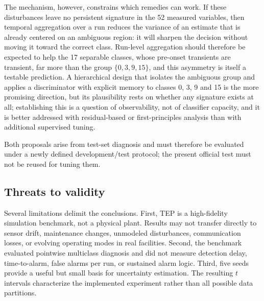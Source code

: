 \documentclass[12pt,a4paper]{article}
\begin{document}
The mechanism, however, constrains which remedies can work. If these
disturbances leave no persistent signature in the 52 measured variables, then
temporal aggregation over a run reduces the variance of an estimate that is
already centered on an ambiguous region: it will sharpen the decision without
moving it toward the correct class. Run-level aggregation should therefore be
expected to help the 17 separable classes, whose pre-onset transients are
transient, far more than the group $\{0,3,9,15\}$, and this asymmetry is itself
a testable prediction. A hierarchical design that isolates the ambiguous group
and applies a discriminator with explicit memory to classes 0, 3, 9 and 15 is
the more promising direction, but its plausibility rests on whether any
signature exists at all; establishing this is a question of observability, not
of classifier capacity, and it is better addressed with residual-based or
first-principles analysis than with additional supervised tuning.

Both proposals arise from test-set diagnosis and must therefore be evaluated
under a newly defined development/test protocol; the present official test must
not be reused for tuning them.

\subsection{Threats to validity}

Several limitations delimit the conclusions. First, TEP is a high-fidelity
simulation benchmark, not a physical plant. Results may not transfer directly
to sensor drift, maintenance changes, unmodeled disturbances, communication
losses, or evolving operating modes in real facilities. Second, the benchmark
evaluated pointwise multiclass diagnosis and did not measure detection delay,
time-to-alarm, false alarms per run, or sustained alarm logic. Third, five seeds
provide a useful but small basis for uncertainty estimation. The resulting
$t$ intervals characterize the implemented experiment rather than all possible
data partitions.
\end{document}
